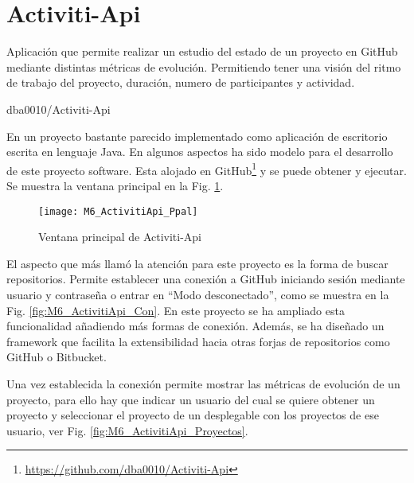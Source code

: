 
\section{Activiti-Api}

\epigraph{Aplicación que permite realizar un estudio del estado de un proyecto en GitHub mediante distintas métricas de evolución. Permitiendo tener una visión del ritmo de trabajo del proyecto, duración, numero de participantes y actividad.}{dba0010/Activiti-Api}

En un proyecto bastante parecido implementado como aplicación de escritorio escrita en lenguaje Java. En algunos aspectos ha sido modelo para el desarrollo de este proyecto software. Esta alojado en GitHub\footnote{\url{https://github.com/dba0010/Activiti-Api}} y se puede obtener y ejecutar. Se muestra la ventana principal en la Fig. \ref{fig:M6_ActivitiApi_Ppal}.

\begin{figure}[h!]
	\centering
	\texttt{[image: M6\_ActivitiApi\_Ppal]}
	\caption{Ventana principal de Activiti-Api}\label{fig:M6_ActivitiApi_Ppal}
\end{figure}

El aspecto que más llamó la atención para este proyecto es la forma de buscar repositorios. Permite establecer una conexión a GitHub iniciando sesión mediante usuario y contraseña o entrar en ``Modo desconectado'', como se muestra en la Fig. \ref{fig:M6_ActivitiApi_Con}. En este proyecto se ha ampliado esta funcionalidad añadiendo más formas de conexión. Además, se ha diseñado un framework que facilita la extensibilidad hacia otras forjas de repositorios como GitHub o Bitbucket.


Una vez establecida la conexión permite mostrar las métricas de evolución de un proyecto, para ello hay que indicar un usuario del cual se quiere obtener un proyecto y seleccionar el proyecto de un desplegable con los proyectos de ese usuario, ver Fig. \ref{fig:M6_ActivitiApi_Proyectos}.


